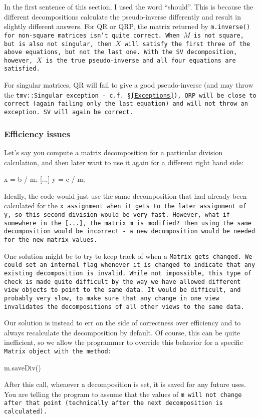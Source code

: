 In the first sentence of this section, I used the word ``should''.  
This is because the different decompositions calculate the pseudo-inverse 
differently and result in slightly
different answers.  For QR or QRP, the matrix returned by \tt{m.inverse()} for
non-square matrices isn't
quite correct.  When $M$ is not square, but is also not singular, then $X$
will satisfy the first three of the above equations,
but not the last one.  With the SV decomposition, however,
$X$ is the true pseudo-inverse and all four equations are satisfied.

For singular matrices, QR will fail to give a good pseudo-inverse (and may throw the
\tt{tmv::Singular} exception - c.f. \S\ref{Exceptions}), QRP will be close to correct
(again failing only the last equation) and will not throw an exception.  SV will again be correct.

\subsubsection{Efficiency issues}
\label{Matrix_Division_Efficiency}

Let's say you compute a matrix decomposition for a particular division calculation, and
then later want to use it again for a different right hand side:
\begin{tmvcode}
x = b / m;
[...]
y = c / m;
\end{tmvcode}
Ideally, the code would just use the same decomposition that had already been calculated
for the \tt{x} assignment when it gets to the later assignment of \tt{y}, 
so this second division would be very fast.
However, what if somewhere in the \tt{[...]}, the matrix \tt{m} is modified?  
Then using
the same decomposition would be incorrect - a new decomposition would be needed
for the new matrix values.

One solution might be to try to keep track of when a \tt{Matrix} gets changed.  
We could set an
internal flag whenever it is changed to indicate that
any existing decomposition is invalid.  While not impossible,
this type of check is made
quite difficult by the way we have allowed different view objects to point to the same data.  
It would
be difficult, and probably very slow, to make sure that any change in one view invalidates the decompositions
of all other views to the same data.

Our solution is instead to err on the side of correctness over efficiency and
to always recalculate the decomposition by default.  Of course, this
can be quite inefficient, so we allow the programmer to override this
behavior for a specific \tt{Matrix} object with the method:
\begin{tmvcode}
m.saveDiv()
\end{tmvcode}
After this call, whenever a decomposition is set, it is saved for any future uses.
You are telling the program to assume that the values of \tt{m} will not change after 
that point (technically after
the next decomposition is calculated).

